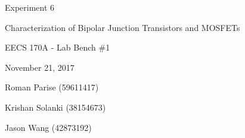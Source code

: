 \begin{titlepage}
	\centering
	\vspace{2.5cm}
	{\huge Experiment 6 \par}
	{\LARGE Characterization of Bipolar Junction Transistors and MOSFETs  \par}
	\vspace{1cm}
	{\Large EECS 170A - Lab Bench \#1 \par}
	{\Large November 21, 2017 \par}
	\vspace{1cm}
	{\large Roman Parise (59611417) \par}
	{\large Krishan Solanki (38154673) \par}
	{\large Jason Wang (42873192) \par}
	\vspace{1cm}
\end{titlepage}

